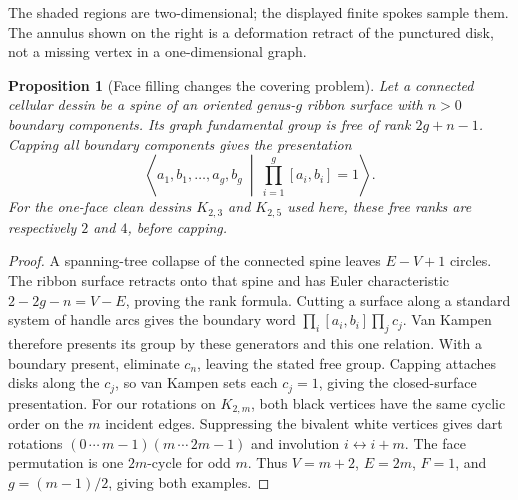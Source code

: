 \documentclass[11pt,oneside,openany]{book}
\newtheorem{proposition}[theorem]{Proposition}
\theoremstyle{definition}\newtheorem{definition}[theorem]{Definition}
\theoremstyle{remark}\newtheorem{remark}[theorem]{Remark}
\begin{document}
\begin{center}
\end{center}
The shaded regions are two-dimensional; the displayed finite spokes sample
them. The annulus shown on the right is a deformation retract of the punctured
disk, not a missing vertex in a one-dimensional graph.

\begin{proposition}[Face filling changes the covering problem]
Let a connected cellular dessin be a spine of an oriented genus-$g$ ribbon
surface with $n>0$ boundary components. Its graph fundamental group is free
of rank $2g+n-1$. Capping all boundary components gives the presentation
\[
 \left\langle a_1,b_1,\ldots,a_g,b_g\ \middle|\
       \prod_{i=1}^g[a_i,b_i]=1\right\rangle.
\]
For the one-face clean dessins $K_{2,3}$ and $K_{2,5}$ used here, these free
ranks are respectively $2$ and $4$, before capping.
\end{proposition}
\begin{proof}
A spanning-tree collapse of the connected spine leaves $E-V+1$ circles.
The ribbon surface retracts onto that spine and has Euler characteristic
$2-2g-n=V-E$, proving the rank formula. Cutting a surface along a standard
system of handle arcs gives the boundary word
$\prod_i[a_i,b_i]\prod_jc_j$. Van Kampen therefore presents its group by
these generators and this one relation. With a boundary present, eliminate
$c_n$, leaving the stated free group. Capping attaches disks along the $c_j$,
so van Kampen sets each $c_j=1$, giving the closed-surface presentation.
For our rotations on $K_{2,m}$, both black vertices have the same cyclic
order on the $m$ incident edges. Suppressing the bivalent white vertices
gives dart rotations $(0\,\cdots\,m-1)(m\,\cdots\,2m-1)$ and involution
$i\leftrightarrow i+m$. The face permutation is one $2m$-cycle for odd $m$.
Thus $V=m+2$, $E=2m$, $F=1$, and $g=(m-1)/2$, giving both examples.
\end{proof}
\end{document}
